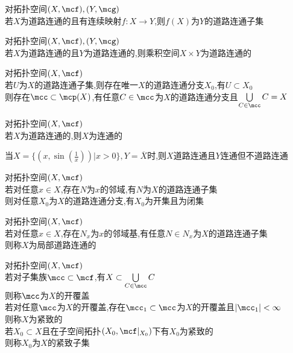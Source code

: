 \begin{dingli}
对拓扑空间$(X,\mcf),(Y,\mcg)$\\
若$X$为道路连通的且有连续映射$f:X\to Y$,则$f(X)$为$Y$的道路连通子集
\end{dingli}

\begin{dingli}
对拓扑空间$(X,\mcf),(Y,\mcg)$\\
若$X$为道路连通的且$Y$为道路连通的,则乘积空间$X\times Y$为道路连通的
\end{dingli}

\begin{dingli}
对拓扑空间$(X,\mcf)$\\
若$U$为$X$的道路连通子集,则存在唯一$X$的道路连通分支$X_0$,有$U\subset X_0$\\
则存在$\mcc\subset\mcp(X)$,有任意$C\in\mcc$为$X$的道路连通分支且$\bigcup\limits_{C\in\mcc}C=X$
\end{dingli}

\begin{dingli}
对拓扑空间$(X,\mcf)$\\
若$X$为道路连通的,则$X$为连通的
\end{dingli}

\begin{zhu}
当$X=\{(x,\sin(\frac{1}{x}))|x>0\},Y=\overline{X}$时,则$X$道路连通且$Y$连通但不道路连通
\end{zhu}

\begin{dingli}
对拓扑空间$(X,\mcf)$\\
若对任意$x\in X$,存在$N$为$x$的邻域,有$N$为$X$的道路连通子集\\
则对任意$X_0$为$X$的道路连通分支,有$X_0$为开集且为闭集
\end{dingli}

\begin{dingyi}
对拓扑空间$(X,\mcf)$\\
若对任意$x\in X$,存在$N_{x}$为$x$的邻域基,有任意$N\in N_{x}$为$X$的道路连通子集\\
则称$X$为局部道路连通的
\end{dingyi}

\begin{dingyi}
对拓扑空间$(X,\mcf)$\\
若对子集族$\mcc\subset\mcf$,有$X\subset\bigcup\limits_{C\in\mcc}C$\\
则称$\mcc$为$X$的开覆盖\\
若对任意$\mcc$为$X$的开覆盖,存在$\mcc_{1}\subset\mcc$为$X$的开覆盖且$|\mcc_{1}|<\infty$\\
则称$X$为紧致的\\
若$X_0\subset X$且在子空间拓扑$(X_0,\mcf|_{X_0})$下有$X_0$为紧致的\\
则称$X_0$为$X$的紧致子集
\end{dingyi}

